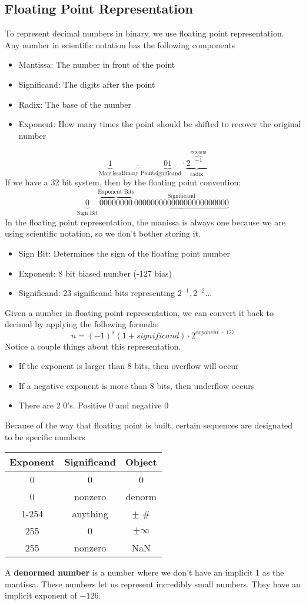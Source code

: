\documentclass{article}
\begin{document}
\subsection{Floating Point Representation}
To represent decimal numbers in binary, we use floating point representation.
Any number in scientific notation has the following components
\begin{itemize}
    \item Mantissa: The number in front of the point
    \item Significand: The digits after the point
    \item Radix: The base of the number
    \item Exponent: How many times the point should be shifted to recover the original number
\end{itemize}
\[
    \underbrace{1}_{\text{Mantissa}}\underbrace{.}_{\text{Binary Point}}\underbrace{01}_{\text{significand}} \cdot \underbrace{2 ^ {\overbrace{-1}^{\text{exponent}}}}_{\text{radix}} 
\]
If we have a 32 bit system, then by the floating point convention:
\[
    \underbrace{0}_{\text{Sign Bit}}\overbrace{00000000}^{\text{Exponent Bits}}\underbrace{00000000000000000000000}^{\text{Significand}}
\]
In the floating point representation, the manissa is always one because we are using scientific notation, so we don't bother storing it.
\begin{itemize}
    \item Sign Bit: Determines the sign of the floating point number
    \item Exponent: 8 bit biased number (-127 bias)
    \item Significand: 23 significand bits representing $2^{-1}, 2^{-2}...$
\end{itemize}
Given a number in floating point representation, we can convert it back to decimal by applying the following formula:
$$n = (-1)^s(1+significand)\cdot2^{exponent - 127}$$
Notice a couple things about this representation.
\begin{itemize}
    \item If the exponent is larger than 8 bits, then overflow will occur
    \item If a negative exponent is more than 8 bits, then underflow occurs
    \item There are 2 0's. Positive 0 and negative 0
\end{itemize}
Because of the way that floating point is built, certain sequences are designated to be specific numbers
\begin{center}
    \begin{tabular}{c|c|c}
     Exponent & Significand & Object \\
     \hline
     0 & 0 & 0 \\  
     0 & nonzero & denorm\\
     1-254 & anything & $\pm$ \#\\
     255 & 0 & $\pm \infty$\\
     255 & nonzero & NaN    
    \end{tabular}
\end{center}
A \textbf{denormed number} is a number where we don't have an implicit 1 as the mantissa. These
numbers let us represent incredibly small numbers. They have an implicit exponent of $-126$.
\end{document}
